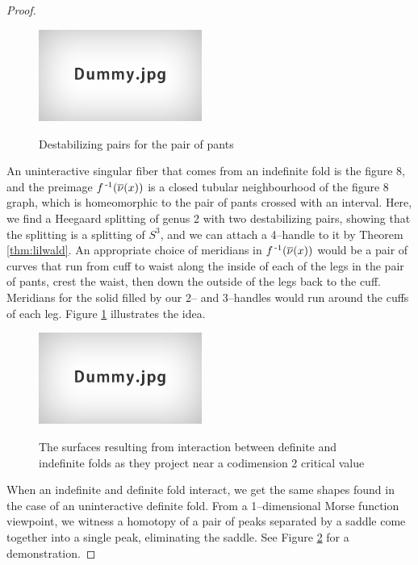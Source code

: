 \begin{proof}
	\begin{figure}
		\centering
		\caption{Destabilizing pairs for the pair of pants}
		\includegraphics[height=3cm]{figures/dummy.jpg}
		\label{fig:destabpants}
	\end{figure}
		
	An uninteractive singular fiber that comes from an indefinite fold is the figure 8, and the preimage $f^{\,\text{-}1}(\overline{\nu}(x))$ is a closed tubular neighbourhood of the figure 8 graph, which is homeomorphic to the pair of pants crossed with an interval.
	Here, we find a Heegaard splitting of genus 2 with two destabilizing pairs, showing that the splitting is a splitting of $S^3$, and we can attach a 4--handle to it by Theorem \ref{thm:lilwald}.
	An appropriate choice of meridians in $f^{\,\text{-}1}(\overline{\nu}(x))$ would be a pair of curves that run from cuff to waist along the inside of each of the legs in the pair of pants, crest the waist, then down the outside of the legs back to the cuff.
	Meridians for the solid filled by our 2-- and 3--handles would run around the cuffs of each leg.
	Figure \ref{fig:destabpants} illustrates the idea.
	
	\begin{figure}
		\centering
		\captionsetup{justification=centering}
		\caption{The surfaces resulting from interaction between definite and indefinite folds as they project near a codimension 2 critical value}
		\includegraphics[height=3cm]{figures/dummy.jpg}
		\label{fig:defindefconn}
	\end{figure}
	
	When an indefinite and definite fold interact, we get the same shapes found in the case of an uninteractive definite fold.
	From a 1--dimensional Morse function viewpoint, we witness a homotopy of a pair of peaks separated by a saddle come together into a single peak, eliminating the saddle.
	See Figure \ref{fig:defindefconn} for a demonstration.


\end{proof}

